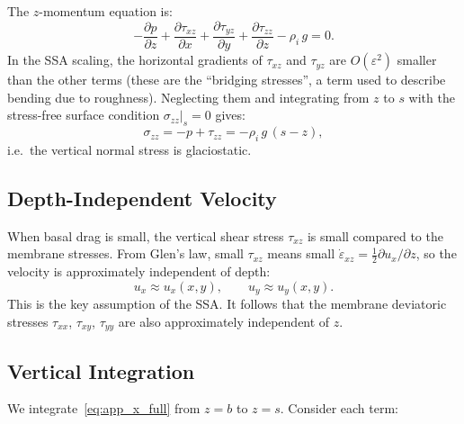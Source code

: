 \documentclass[11pt]{article}
\begin{document}
\medskip
\noindent The $z$-momentum equation is:
\begin{equation}
  -\frac{\partial p}{\partial z} + \frac{\partial \tau_{xz}}{\partial x} + \frac{\partial \tau_{yz}}{\partial y} + \frac{\partial \tau_{zz}}{\partial z} - \rho_i\,g = 0.
  \label{eq:app_z_full}
\end{equation}
In the SSA scaling, the horizontal gradients of $\tau_{xz}$ and $\tau_{yz}$ are $O(\varepsilon^2)$ smaller than the other terms (these are the ``bridging stresses'', a term used to describe bending due to roughness).  Neglecting them and integrating from $z$ to $s$ with the stress-free surface condition $\sigma_{zz}|_s = 0$ gives:
\begin{equation}
  \sigma_{zz} = -p + \tau_{zz} = -\rho_i\,g\,(s - z),
  \label{eq:app_glaciostatic}
\end{equation}
i.e.\ the vertical normal stress is glaciostatic.

\subsection{Depth-Independent Velocity}

When basal drag is small, the vertical shear stress $\tau_{xz}$ is small compared to the membrane stresses.  From Glen's law, small $\tau_{xz}$ means small $\dot{\varepsilon}_{xz} = \frac{1}{2}\partial u_x/\partial z$, so the velocity is approximately independent of depth:
\begin{equation}
  u_x \approx u_x(x,y), \qquad u_y \approx u_y(x,y).
\end{equation}
This is the key assumption of the SSA.  It follows that the membrane deviatoric stresses $\tau_{xx}$, $\tau_{xy}$, $\tau_{yy}$ are also approximately independent of $z$.

\subsection{Vertical Integration}

We integrate~\eqref{eq:app_x_full} from $z = b$ to $z = s$.  Consider each term:
\end{document}
